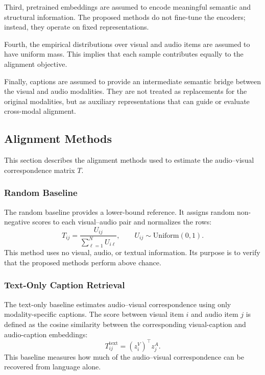 Third, pretrained embeddings are assumed to encode meaningful semantic and structural information. The proposed methods do not fine-tune the encoders; instead, they operate on fixed representations.

Fourth, the empirical distributions over visual and audio items are assumed to have uniform mass. This implies that each sample contributes equally to the alignment objective.

Finally, captions are assumed to provide an intermediate semantic bridge between the visual and audio modalities. They are not treated as replacements for the original modalities, but as auxiliary representations that can guide or evaluate cross-modal alignment.

\subsection{Alignment Methods}
\label{subsec:alignment_methods}

This section describes the alignment methods used to estimate the audio--visual correspondence matrix $T$.

\subsubsection{Random Baseline}
\label{subsubsec:random_baseline}

The random baseline provides a lower-bound reference. It assigns random non-negative scores to each visual--audio pair and normalizes the rows:
\begin{equation}
    T_{ij}
    =
    \frac{U_{ij}}
    {\sum_{\ell=1}^{N} U_{i\ell}},
    \qquad
    U_{ij} \sim \mathrm{Uniform}(0,1).
\end{equation}
This method uses no visual, audio, or textual information. Its purpose is to verify that the proposed methods perform above chance.

\subsubsection{Text-Only Caption Retrieval}
\label{subsubsec:text_only}

The text-only baseline estimates audio--visual correspondence using only modality-specific captions. The score between visual item $i$ and audio item $j$ is defined as the cosine similarity between the corresponding visual-caption and audio-caption embeddings:
\begin{equation}
    T^{\mathrm{text}}_{ij}
    =
    (z_i^V)^{\top} z_j^A.
\end{equation}
This baseline measures how much of the audio--visual correspondence can be recovered from language alone.

